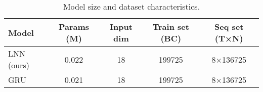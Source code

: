 \begin{table}[t]
\centering
\caption{Model size and dataset characteristics.}
\label{tab:modelsize}
\begin{tabular}{lcccc}
\toprule
Model & Params (M) & Input dim & Train set (BC) & Seq set (T×N) \\
\midrule
LNN (ours) & 0.022 & 18 & 199725 & 8×136725 \\
GRU & 0.021 & 18 & 199725 & 8×136725 \\
\bottomrule
\end{tabular}

\end{table}
